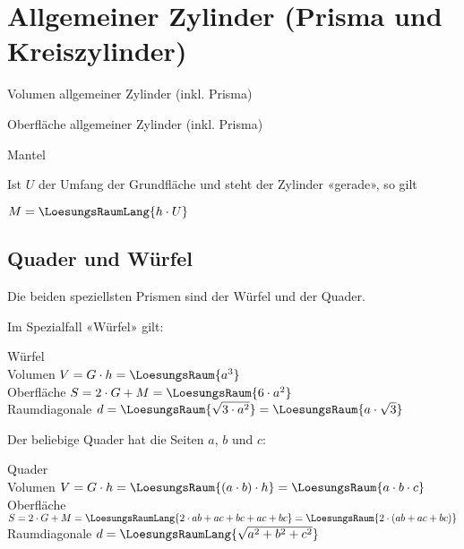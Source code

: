 \section{Allgemeiner Zylinder (Prisma und Kreiszylinder)}


\begin{gesetz}{Volumen allgemeiner Zylinder (inkl. Prisma)}{}

  \begin{center}\end{center}
\end{gesetz}

\begin{gesetz}{Oberfläche allgemeiner Zylinder (inkl. Prisma)}{}

  \begin{center}\end{center}
\end{gesetz}

\begin{bemerkung}{Mantel}{}

  Ist $U$ der Umfang der Grundfläche und steht der Zylinder «gerade»,
  so gilt

  $M = \LoesungsRaumLang{h \cdot U}$
  \end{bemerkung}


\newpage
\subsection{Quader und Würfel}\label{QuaderUndWuerfel}
Die beiden speziellsten Prismen sind der Würfel und der Quader.

Im Spezialfall «Würfel» gilt:
\begin{gesetz}{Würfel}{}\\
  Volumen $V = G\cdot{} h = \LoesungsRaum{a^3}$\\
  Oberfläche $S=2\cdot{}G + M = \LoesungsRaum{6\cdot{}a^2}$\\
  Raumdiagonale $d = \LoesungsRaum{\sqrt{3\cdot{}a^2}} = \LoesungsRaum{a\cdot{}\sqrt{3}}$
\end{gesetz}


Der beliebige Quader hat die Seiten $a$, $b$ und $c$:
\begin{gesetz}{Quader}{}\\
  Volumen $V = G\cdot{} h = \LoesungsRaum{(a\cdot{}b)\cdot{}h} = \LoesungsRaum{a\cdot{}b\cdot{}c}$\\
  Oberfläche $S=2\cdot{}G + M = \LoesungsRaumLang{2\cdot{}ab + ac + bc + ac + bc} = \LoesungsRaum{2\cdot{}(ab + ac + bc)}$\\
  Raumdiagonale $d = \LoesungsRaumLang{\sqrt{a^2 + b^2 + c^2}}$
\end{gesetz}

